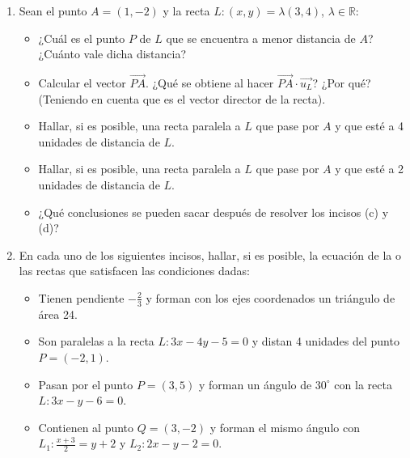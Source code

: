 \documentclass[11pt]{article}
\begin{document}
\begin{enumerate}[\hspace{-7mm}$1)$]
\item Sean el punto $A = (1,-2)$ y la recta $L : (x, y) = \lambda(3, 4)$, $\lambda \in \mathbb{R}$:

\begin{itemize}
    \item[(a)] ¿Cuál es el punto $P$ de $L$ que se encuentra a menor distancia de $A$? ¿Cuánto vale dicha distancia?
    \item[(b)] Calcular el vector $\overrightarrow{PA}$. ¿Qué se obtiene al hacer $\overrightarrow{PA} \cdot \overrightarrow{u_L}$? ¿Por qué? (Teniendo en cuenta que es el vector director de la recta).
    \item[(c)] Hallar, si es posible, una recta paralela a $L$ que pase por $A$ y que esté a 4 unidades de distancia de $L$.
    \item[(d)] Hallar, si es posible, una recta paralela a $L$ que pase por $A$ y que esté a 2 unidades de distancia de $L$.
    \item[(e)] ¿Qué conclusiones se pueden sacar después de resolver los incisos (c) y (d)?
\end{itemize}











\item  En cada uno de los siguientes incisos, hallar, si es posible, la ecuación de la o las rectas que satisfacen las condiciones dadas:

\begin{itemize}
    \item[(a)] Tienen pendiente $-\frac{2}{3}$ y forman con los ejes coordenados un triángulo de área 24.
    \item[(b)] Son paralelas a la recta $L : 3x - 4y - 5 = 0$ y distan 4 unidades del punto $P = (-2, 1)$.
    \item[(c)] Pasan por el punto $P = (3, 5)$ y forman un ángulo de $30^\circ$ con la recta $L : 3x - y - 6 = 0$.
    \item[(d)] Contienen al punto $Q = (3,-2)$ y forman el mismo ángulo con $L_1 : \frac{x + 3}{2} = y + 2$ y $L_2 : 2x - y - 2 = 0$.
\end{itemize}









 



\end{enumerate}
\end{document}
